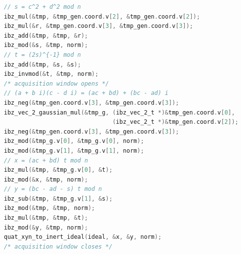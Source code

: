 \begin{lstlisting}[language=C, float=tb, basicstyle=\ttfamily\scriptsize, label={lst:exp-equivprime},
  caption={Traced tail of \texttt{quat\_ideal\_create\_O0\_inert\_odd}
  (\texttt{src/ideal.c}), the routine that turns the accepted generator into
  the inert representation $(n,(x,y))$ of $J_t$ inside
  \textsf{EquivalentCoprimeIdeal}. \texttt{tmp\_gen.coord.v[0..3]} hold the
  coordinates $a,b,c,d$ of $\gamma'$ reduced modulo \texttt{norm}${}=n$. The
  acquisition window is the region between the two comments. The routine
  stores $x'=(ac+bd)\,t \bmod n$ and $y'=(bc-ad-s)\,t \bmod n$; the coordinates
  $x=2x'$ and $y=1+2y'$ quoted in the text are formed when the generator is
  reconstituted (\texttt{quat\_ideal\_odd\_inert\_gen}).}]
// s = c^2 + d^2 mod n
ibz_mul(&tmp, &tmp_gen.coord.v[2], &tmp_gen.coord.v[2]);
ibz_mul(&r, &tmp_gen.coord.v[3], &tmp_gen.coord.v[3]);
ibz_add(&tmp, &tmp, &r);
ibz_mod(&s, &tmp, norm);
// t = (2s)^{-1} mod n
ibz_add(&tmp, &s, &s);
ibz_invmod(&t, &tmp, norm);
/* acquisition window opens */
// (a + b i)(c - d i) = (ac + bd) + (bc - ad) i
ibz_neg(&tmp_gen.coord.v[3], &tmp_gen.coord.v[3]);
ibz_vec_2_gaussian_mul(&tmp_g, (ibz_vec_2_t *)&tmp_gen.coord.v[0],
                               (ibz_vec_2_t *)&tmp_gen.coord.v[2]);
ibz_neg(&tmp_gen.coord.v[3], &tmp_gen.coord.v[3]);
ibz_mod(&tmp_g.v[0], &tmp_g.v[0], norm);
ibz_mod(&tmp_g.v[1], &tmp_g.v[1], norm);
// x = (ac + bd) t mod n
ibz_mul(&tmp, &tmp_g.v[0], &t);
ibz_mod(&x, &tmp, norm);
// y = (bc - ad - s) t mod n
ibz_sub(&tmp, &tmp_g.v[1], &s);
ibz_mod(&tmp, &tmp, norm);
ibz_mul(&tmp, &tmp, &t);
ibz_mod(&y, &tmp, norm);
quat_xyn_to_inert_ideal(ideal, &x, &y, norm);
/* acquisition window closes */
\end{lstlisting}
